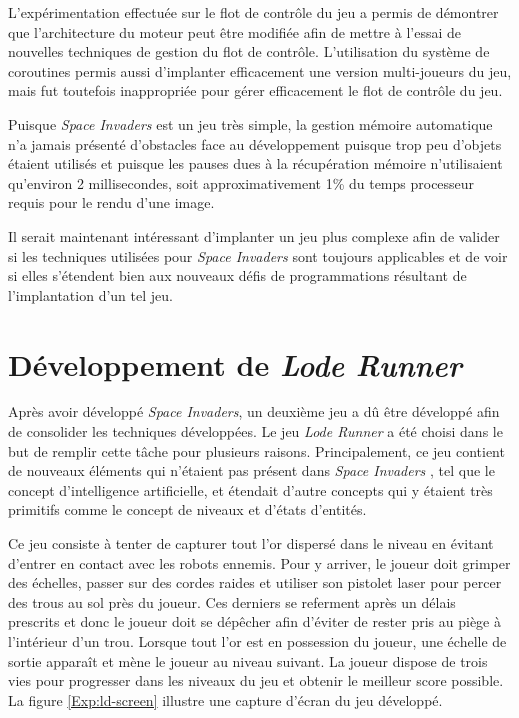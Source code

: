 \documentclass[12pt,twoside,letterpaper,francais]{book}
\newcommand{\lr}{{\textit{Lode Runner }}}
\newcommand{\si}{{\textit{Space Invaders }}}
\begin{document}
L'expérimentation effectuée sur le flot de contrôle du jeu a permis de
démontrer que l'architecture du moteur peut être modifiée afin de
mettre à l'essai de nouvelles techniques de gestion du flot de
contrôle. L'utilisation du système de coroutines permis aussi
d'implanter efficacement une version multi-joueurs du jeu, mais fut
toutefois inappropriée pour gérer efficacement le flot de contrôle du
jeu.

Puisque \si est un jeu très simple, la gestion mémoire automatique n'a
jamais présenté d'obstacles face au développement puisque trop peu
d'objets étaient utilisés et puisque les pauses dues à la récupération
mémoire n'utilisaient qu'environ 2 millisecondes, soit
approximativement 1\% du temps processeur requis pour le rendu d'une
image.

Il serait maintenant intéressant d'implanter un jeu plus complexe afin
de valider si les techniques utilisées pour \si sont toujours
applicables et de voir si elles s'étendent bien aux nouveaux défis de
programmations résultant de l'implantation d'un tel jeu.


\FloatBarrier
\section{Développement de \lr} \label{Exp:ld}
Après avoir développé \textit{Space Invaders}, un deuxième jeu a dû
être développé afin de consolider les techniques développées. Le jeu
\lr a été choisi dans le but de remplir cette tâche pour plusieurs
raisons. Principalement, ce jeu contient de nouveaux éléments qui
n'étaient pas présent dans \si, tel que le concept d'intelligence
artificielle, et étendait d'autre concepts qui y étaient très
primitifs comme le concept de niveaux et d'états d'entités.

Ce jeu consiste à tenter de capturer tout l'or dispersé dans le niveau
en évitant d'entrer en contact avec les robots ennemis. Pour y
arriver, le joueur doit grimper des échelles, passer sur des cordes
raides et utiliser son pistolet laser pour percer des trous au sol
près du joueur. Ces derniers se referment après un délais prescrits et
donc le joueur doit se dépêcher afin d'éviter de rester pris au piège
à l'intérieur d'un trou. Lorsque tout l'or est en possession du
joueur, une échelle de sortie apparaît et mène le joueur au niveau
suivant. La joueur dispose de trois vies pour progresser dans les
niveaux du jeu et obtenir le meilleur score possible. La figure
\ref{Exp:ld-screen} illustre une capture d'écran du jeu développé.\\
\end{document}
